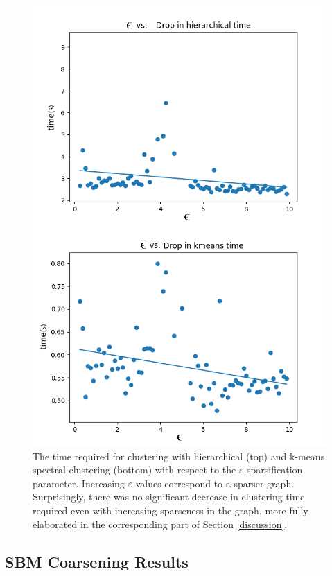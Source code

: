 \documentclass{article}
\begin{document}
\begin{figure}[H]
    \centering
    \includegraphics[width=.85\textwidth]{results/results_time_sparse.png}
    \caption[Clustering time vs. $\varepsilon$ sparsification parameter]{The time required for clustering with hierarchical (top) and k-means spectral clustering (bottom) with respect to the $\varepsilon$ sparsification parameter. Increasing $\varepsilon$ values correspond to a sparser graph. Surprisingly, there was no significant decrease in clustering time required even with increasing sparseness in the graph, more fully elaborated in the corresponding part of Section \ref{discussion}.}
    \label{fig:results_time_sparse}
\end{figure}

\subsection{SBM Coarsening Results}
\end{document}

